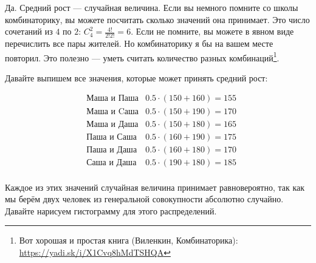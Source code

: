 \documentclass[12pt, a4paper, oneside]{article}
\theoremstyle{plain} %
\theoremstyle{definition}
\begin{document}
\begin{solution}
Да. Средний рост --- случайная величина. Если вы немного помните со школы комбинаторику, вы можете посчитать сколько значений она принимает. Это число сочетаний из $4$ по $2$:  $C_4^2 = \frac{4!}{2!2!} =  6$. Если не помните, вы можете в явном виде перечислить все пары жителей. Но комбинаторику я бы на вашем месте повторил. Это полезно --- уметь считать количество разных комбинаций\footnote{Вот хорошая и простая книга (Виленкин, Комбинаторика): \url{https://yadi.sk/i/X1Cvq8hMdTSHQA}}.  

Давайте выпишем все значения, которые может принять средний рост: 

\begin{equation*}
\begin{aligned}
& \text{Маша и Паша}  & 0.5 \cdot (150 + 160) = 155 \\
& \text{Маша и Cаша}  & 0.5 \cdot (150 + 190) = 170 \\
& \text{Маша и Даша}  & 0.5 \cdot (150 + 180) = 165 \\
& \text{Паша и Саша}  & 0.5 \cdot (160 + 190) = 175 \\
& \text{Паша и Даша}  & 0.5 \cdot (160 + 180) =  170 \\
& \text{Саша и Даша}  & 0.5 \cdot (190 + 180) =  185 \\
\end{aligned} 
\end{equation*}

Каждое из этих значений случайная величина принимает равновероятно, так как мы берём двух человек из генеральной совокупности абсолютно случайно.  Давайте нарисуем гистограмму для этого распределений. 


\end{solution}
\end{document}
